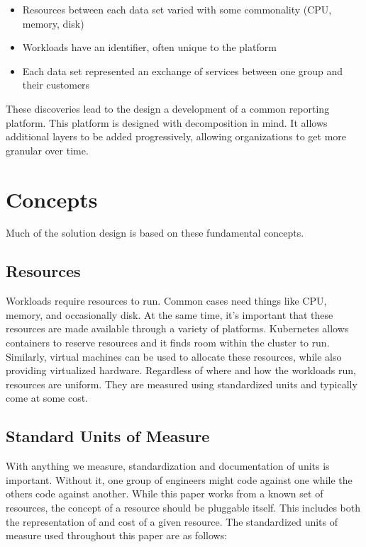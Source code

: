\documentclass[10pt, a4paper, twocolumn]{article}
\begin{document}
  \begin{itemize}
    \item Resources between each data set varied with some commonality (CPU, memory, disk)
    \item Workloads have an identifier, often unique to the platform
    \item Each data set represented an exchange of services between one group and their customers
  \end{itemize}

  These discoveries lead to the design a development of a common reporting platform.
  This platform is designed with decomposition in mind.
  It allows additional layers to be added progressively, allowing organizations to get more granular over time.

\section*{Concepts}
  Much of the solution design is based on these fundamental concepts.

  \subsection*{Resources}
    Workloads require resources to run.
    Common cases need things like CPU, memory, and occasionally disk.
    At the same time, it's important that these resources are made available through a variety of platforms.
    Kubernetes allows containers to reserve resources and it finds room within the cluster to run.
    Similarly, virtual machines can be used to allocate these resources, while also providing virtualized hardware.
    Regardless of where and how the workloads run, resources are uniform.
    They are measured using standardized units and typically come at some cost.

  \subsection*{Standard Units of Measure}
    With anything we measure, standardization and documentation of units is important.
    Without it, one group of engineers might code against one while the others code against another.
    While this paper works from a known set of resources, the concept of a resource should be pluggable itself.
    This includes both the representation of and cost of a given resource.
    The standardized units of measure used throughout this paper are as follows:
\end{document}
